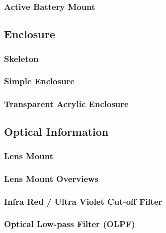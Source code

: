 \subsubsection{Active Battery Mount}
\subsection{Enclosure}
\subsubsection{Skeleton}
\subsubsection{Simple Enclosure}
\subsubsection{Transparent Acrylic Enclosure}
\subsection{Optical Information}
\subsubsection{Lens Mount}
\subsubsection{Lens Mount Overviews}
\subsubsection{Infra Red / Ultra Violet Cut-off Filter}
\subsubsection{Optical Low-pass Filter (OLPF)}